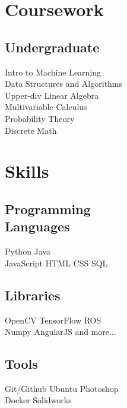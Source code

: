 \documentclass[]{deedy-resume-openfont}
\begin{document}
\begin{minipage}[t]{0.33\textwidth}
\sectionsep


\section{Coursework}
\subsection{Undergraduate}
Intro to Machine Learning \\
Data Structures and Algorithms \\
Upper-div Linear Algebra \\
Multivariable Calculus \\
Probability Theory \\
Discrete Math \\
\sectionsep


\section{Skills}
\subsection{Programming \\ Languages}
Python \textbullet{} Java \\
JavaScript \textbullet{} HTML \textbullet{} CSS \textbullet{} SQL
\sectionsep

\subsection{Libraries}
OpenCV \textbullet{} TensorFlow \textbullet{} ROS \\
Numpy \textbullet{} AngularJS \textbullet{} and more... \\
\sectionsep

\subsection{Tools}
Git/Github \textbullet{} Ubuntu \textbullet{} Photoshop \\
Docker \textbullet{} Solidworks
\sectionsep


\end{minipage}
\end{document}
